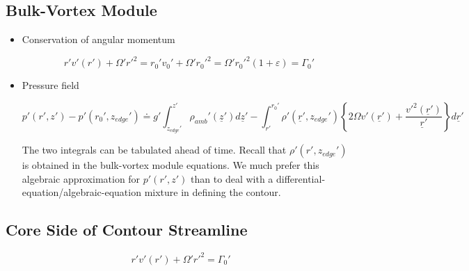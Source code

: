 \documentclass[preprint, prX]{revtex4}
\begin{document}
\subsection{Bulk-Vortex Module}

\begin{itemize}
\item Conservation of angular momentum

\begin{equation}
	r'v'(r') + \Omega' r'^2 = r_0' v_0' + \Omega'r_0'^2 = \Omega' r_0'^2(1+\varepsilon) = \Gamma_0'
\end{equation}

\item Pressure field

\begin{equation}
	p'(r',z') - p'(r_0',z_{edge}') \doteq g' \int_{z_{edge}'}^{z'} \rho_{amb}'( \underline{z}') d \underline{z}' - \int_{r'}^{r_0'} \rho'(\underline{r}', z_{edge}')\left \{ 2 \Omega v'(\underline{r}') + \frac{v'^2(\underline{r}')}{\underline{r}'} \right \} d\underline{r}'
\end{equation}

The two integrals can be tabulated ahead of time. Recall that $\rho'(r',z_{edge}')$ is obtained in the bulk-vortex module equations. We much prefer this algebraic approximation for $p'(r',z')$ than to deal with a differential-equation/algebraic-equation mixture in defining the contour.

\end{itemize} 

\subsection{Core Side of Contour Streamline}
\begin{equation}
	r'v'(r') + \Omega' r'^2 = \Gamma_0'
\end{equation}
\end{document}
